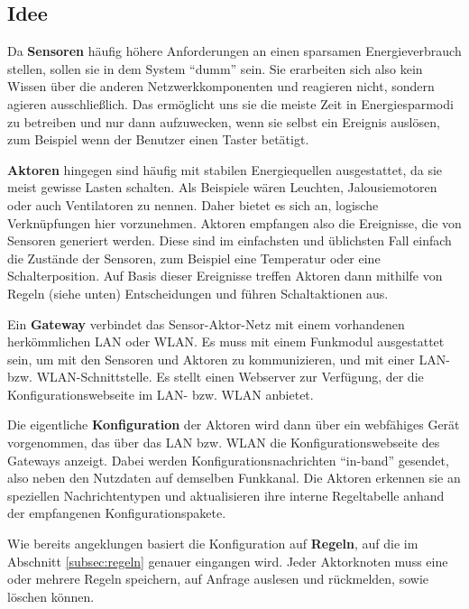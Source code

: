 \documentclass[conference]{IEEEtran}
\begin{document}
    \subsection{Idee}
        Da \textbf{Sensoren} häufig höhere Anforderungen an einen sparsamen
        Energieverbrauch stellen, sollen sie in dem System \enquote{dumm} sein.
        Sie erarbeiten sich also kein Wissen über die anderen Netzwerkkomponenten
        und reagieren nicht, sondern agieren ausschließlich.
        Das ermöglicht uns sie die meiste Zeit in Energiesparmodi zu betreiben
        und nur dann aufzuwecken, wenn sie selbst ein Ereignis auslösen,
        zum Beispiel wenn der Benutzer einen Taster betätigt.

        \textbf{Aktoren} hingegen sind häufig mit stabilen Energiequellen
        ausgestattet, da sie meist gewisse Lasten schalten.
        Als Beispiele wären Leuchten, Jalousiemotoren oder auch Ventilatoren
        zu nennen.
        Daher bietet es sich an, logische Verknüpfungen hier vorzunehmen.
        Aktoren empfangen also die Ereignisse, die von Sensoren generiert werden.
        Diese sind im einfachsten und üblichsten Fall einfach die Zustände
        der Sensoren, zum Beispiel eine Temperatur oder eine Schalterposition.
        Auf Basis dieser Ereignisse treffen Aktoren dann mithilfe von
        Regeln (siehe unten) Entscheidungen und führen Schaltaktionen aus.

        Ein \textbf{Gateway} verbindet das Sensor-Aktor-Netz mit einem
        vorhandenen herkömmlichen \ac{LAN} oder \ac{WLAN}.
        Es muss mit einem Funkmodul ausgestattet sein,
        um mit den Sensoren und Aktoren zu kommunizieren,
        und mit einer \ac{LAN}- bzw. \ac{WLAN}-Schnittstelle.
        Es stellt einen Webserver zur Verfügung,
        der die Konfigurationswebseite im \ac{LAN}- bzw. \ac{WLAN} anbietet.

        Die eigentliche \textbf{Konfiguration} der Aktoren wird dann
        über ein webfähiges Gerät vorgenommen,
        das über das \ac{LAN} bzw. \ac{WLAN} die
        Konfigurationswebseite des Gateways anzeigt.
        Dabei werden Konfigurationsnachrichten \enquote{in-band} gesendet,
        also neben den Nutzdaten auf demselben Funkkanal.
        Die Aktoren erkennen sie an speziellen Nachrichtentypen
        und aktualisieren ihre interne Regeltabelle anhand der empfangenen
        Konfigurationspakete.

        Wie bereits angeklungen basiert die Konfiguration auf \textbf{Regeln},
        auf die im Abschnitt \ref{subsec:regeln} genauer eingangen wird.
        Jeder Aktorknoten muss eine oder mehrere Regeln speichern,
        auf Anfrage auslesen und rückmelden, sowie löschen können.
\end{document}

